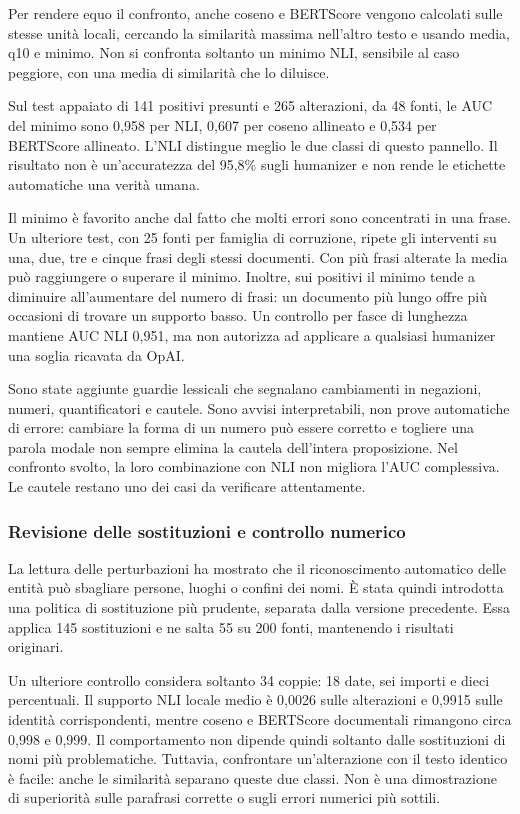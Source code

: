 \documentclass[11pt,a4paper]{article}
\begin{document}
Per rendere equo il confronto, anche coseno e BERTScore vengono calcolati sulle stesse unità locali, cercando la similarità massima nell'altro testo e usando media, q10 e minimo. Non si confronta soltanto un minimo NLI, sensibile al caso peggiore, con una media di similarità che lo diluisce.

Sul test appaiato di 141 positivi presunti e 265 alterazioni, da 48 fonti, le AUC del minimo sono 0,958 per NLI, 0,607 per coseno allineato e 0,534 per BERTScore allineato. L'NLI distingue meglio le due classi di questo pannello. Il risultato non è un'accuratezza del 95,8\% sugli humanizer e non rende le etichette automatiche una verità umana.

Il minimo è favorito anche dal fatto che molti errori sono concentrati in una frase. Un ulteriore test, con 25 fonti per famiglia di corruzione, ripete gli interventi su una, due, tre e cinque frasi degli stessi documenti. Con più frasi alterate la media può raggiungere o superare il minimo. Inoltre, sui positivi il minimo tende a diminuire all'aumentare del numero di frasi: un documento più lungo offre più occasioni di trovare un supporto basso. Un controllo per fasce di lunghezza mantiene AUC NLI 0,951, ma non autorizza ad applicare a qualsiasi humanizer una soglia ricavata da OpAI.

Sono state aggiunte guardie lessicali che segnalano cambiamenti in negazioni, numeri, quantificatori e cautele. Sono avvisi interpretabili, non prove automatiche di errore: cambiare la forma di un numero può essere corretto e togliere una parola modale non sempre elimina la cautela dell'intera proposizione. Nel confronto svolto, la loro combinazione con NLI non migliora l'AUC complessiva. Le cautele restano uno dei casi da verificare attentamente.

\subsubsection{Revisione delle sostituzioni e controllo numerico}\label{revisione-delle-sostituzioni-e-controllo-numerico}

La lettura delle perturbazioni ha mostrato che il riconoscimento automatico delle entità può sbagliare persone, luoghi o confini dei nomi. È stata quindi introdotta una politica di sostituzione più prudente, separata dalla versione precedente. Essa applica 145 sostituzioni e ne salta 55 su 200 fonti, mantenendo i risultati originari.

Un ulteriore controllo considera soltanto 34 coppie: 18 date, sei importi e dieci percentuali. Il supporto NLI locale medio è 0,0026 sulle alterazioni e 0,9915 sulle identità corrispondenti, mentre coseno e BERTScore documentali rimangono circa 0,998 e 0,999. Il comportamento non dipende quindi soltanto dalle sostituzioni di nomi più problematiche. Tuttavia, confrontare un'alterazione con il testo identico è facile: anche le similarità separano queste due classi. Non è una dimostrazione di superiorità sulle parafrasi corrette o sugli errori numerici più sottili.
\end{document}
